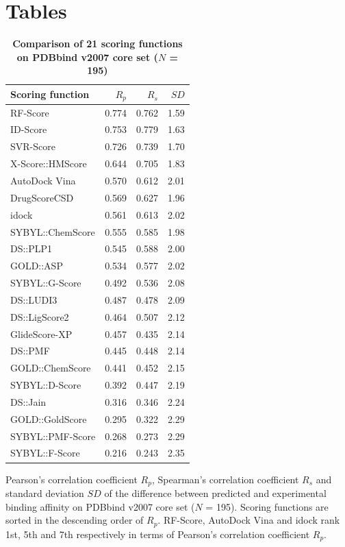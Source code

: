 \documentclass[10pt]{article}
\begin{document}
\section*{Tables}

\begin{table}[!ht]
\caption{
\bf{Comparison of 21 scoring functions on PDBbind v2007 core set ($N$ = 195)}}
\begin{tabular}{lrrr}
\hline
Scoring function & $R_p$ & $R_s$ & $SD$\\
\hline
RF-Score & 0.774 & 0.762 & 1.59\\
ID-Score & 0.753 & 0.779 & 1.63\\
SVR-Score & 0.726 & 0.739 & 1.70\\
X-Score::HMScore & 0.644 & 0.705 & 1.83\\
AutoDock Vina & 0.570 & 0.612 & 2.01\\
DrugScoreCSD & 0.569 & 0.627 & 1.96\\
idock & 0.561 & 0.613 & 2.02\\
SYBYL::ChemScore & 0.555 & 0.585 & 1.98\\
DS::PLP1 & 0.545 & 0.588 & 2.00\\
GOLD::ASP & 0.534 & 0.577 & 2.02\\
SYBYL::G-Score & 0.492 & 0.536 & 2.08\\
DS::LUDI3 & 0.487 & 0.478 & 2.09\\
DS::LigScore2 & 0.464 & 0.507 & 2.12\\
GlideScore-XP & 0.457 & 0.435 & 2.14\\
DS::PMF & 0.445 & 0.448 & 2.14\\
GOLD::ChemScore & 0.441 & 0.452 & 2.15\\
SYBYL::D-Score & 0.392 & 0.447 & 2.19\\
DS::Jain & 0.316 & 0.346 & 2.24\\
GOLD::GoldScore & 0.295 & 0.322 & 2.29\\
SYBYL::PMF-Score & 0.268 & 0.273 & 2.29\\
SYBYL::F-Score & 0.216 & 0.243 & 2.35\\
\end{tabular}
\begin{flushleft}\label{ScoringFunctionComparison} Pearson's correlation coefficient $R_p$, Spearman's correlation coefficient $R_s$ and standard deviation $SD$ of the difference between predicted and experimental binding affinity on PDBbind v2007 core set ($N$ = 195). Scoring functions are sorted in the descending order of $R_p$. RF-Score, AutoDock Vina and idock rank 1st, 5th and 7th respectively in terms of Pearson's correlation coefficient $R_p$.
\end{flushleft}
\end{table}
\end{document}
